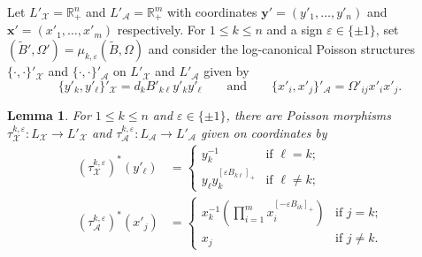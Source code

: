 \documentclass{amsart}
\newtheorem{lemma}[theorem]{Lemma}
\numberwithin{equation}{section}
\newcommand{\bfx}{\mathbf{x}}
\newcommand{\bfy}{\mathbf{y}}
\newcommand{\cA}{\mathcal{A}}
\newcommand{\cX}{\mathcal{X}}
\newcommand{\RR}{\mathbb{R}}
\begin{document}
Let $L'_\cX=\RR_+^n$ and $L'_\cA=\RR_+^m$ with coordinates $\bfy'=(y'_1,\ldots,y'_n)$ and $\bfx'=(x'_1,\ldots,x'_m)$ respectively.
For $1\le k\le n$ and a sign $\varepsilon\in\{\pm1\}$, set $(\tilde B',\Omega')=\mu_{k,\varepsilon}(\tilde B,\Omega)$ and consider the log-canonical Poisson structures $\{\cdot,\cdot\}'_\cX$ and $\{\cdot,\cdot\}'_\cA$ on $L'_\cX$ and $L'_\cA$ given by
\begin{equation}
  \label{eq:brackets}
  \{y'_k,y'_\ell\}'_\cX=d_kB'_{k\ell}y'_ky'_\ell\qquad\text{and}\qquad\{x'_i,x'_j\}'_\cA=\Omega'_{ij}x'_ix'_j.
\end{equation}
\begin{lemma}
  \label{le:tropical transformations}
  For $1\le k\le n$ and $\varepsilon\in\{\pm1\}$, there are Poisson morphisms $\tau_\cX^{k,\varepsilon}:L_\cX\to L'_\cX$ and $\tau_\cA^{k,\varepsilon}:L_\cA\to L'_\cA$ given on coordinates by
  \begin{align}
    \label{eq:tropical X transformation}
    (\tau_\cX^{k,\varepsilon})^*(y'_\ell)&=\begin{cases} y_k^{-1} & \text{if $\ell=k$;}\\ y_\ell y_k^{[\varepsilon B_{k\ell}]_+} & \text{if $\ell\ne k$;}\end{cases}\\
    \label{eq:tropical A transformation}
    (\tau_\cA^{k,\varepsilon})^*(x'_j)&=\begin{cases} x_k^{-1}\left(\prod\limits_{i=1}^m x_i^{[-\varepsilon B_{ik}]_+}\right) & \text{if $j=k$;}\\ x_j & \text{if $j\ne k$.}\end{cases}
  \end{align}
\end{lemma}
\end{document}
